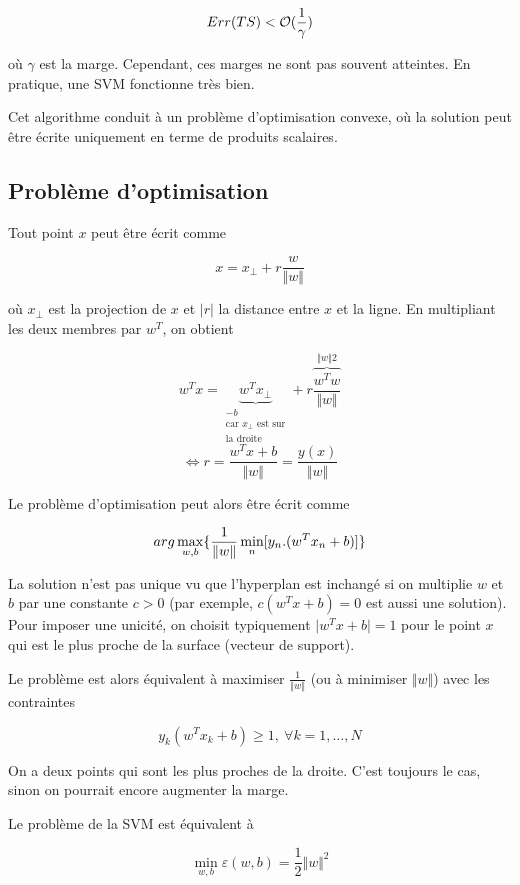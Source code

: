 	$$Err(TS) < \mathcal{O} (\frac{1}{\gamma})$$
	
	où $\gamma$ est la marge. Cependant, ces marges ne sont pas souvent atteintes. En pratique, une SVM fonctionne très bien.
	
	Cet algorithme conduit à un problème d'optimisation convexe, où la solution peut être écrite uniquement en terme de produits scalaires.
	
	\subsection{Problème d'optimisation}
	
	
	Tout point $x$ peut être écrit comme
	
	$$x = x_{\perp} + r \frac{w}{\Vert w \Vert}$$
	
	où $x_{\perp}$ est la projection de $x$ et $\vert r \vert$ la distance entre $x$ et la ligne. En multipliant les deux membres par $w^T$, on obtient
	
	$$w^Tx = \underbrace{w^T x_{\perp}}_{\substack{-b\\ \text{car } x_{\perp} \text{ est sur} \\ \text{la droite}}} + r \frac{\overbrace{w^T w}^{\Vert w \Vert2}}{\Vert w \Vert}$$
	$$\Leftrightarrow r = \frac{w^Tx + b}{\Vert w \Vert} = \frac{y(x)}{\Vert w \Vert}$$
	
	Le problème d'optimisation peut alors être écrit comme 
	
	$$arg \max_{w, b} \lbrace \frac{1}{\Vert w \Vert} \min_n [y_n . (w^T x_n + b)] \rbrace$$
		
	La solution n'est pas unique vu que l'hyperplan est inchangé si  on multiplie $w$ et $b$ par une constante $c > 0$ (par exemple, $c (w^Tx + b) = 0$ est aussi une solution). Pour imposer une unicité, on choisit typiquement $\vert w^T x + b \vert = 1$ pour le point $x$ qui est le plus proche de la surface (vecteur de support).
	
	Le problème est alors équivalent à maximiser $\frac{1}{\Vert w \Vert}$ (ou à minimiser $\Vert w \Vert$) avec les contraintes
	
	$$y_k(w^T x_k + b) \geq 1, \: \forall k = 1, \dots , N$$
	
	On a deux points qui sont les plus proches de la droite. C'est toujours le cas, sinon on pourrait encore augmenter la marge.
	
	Le problème de la SVM est équivalent à
	
	$$\min_{w, b} \varepsilon(w, b) = \frac{1}{2} \Vert w \Vert^2$$
	
